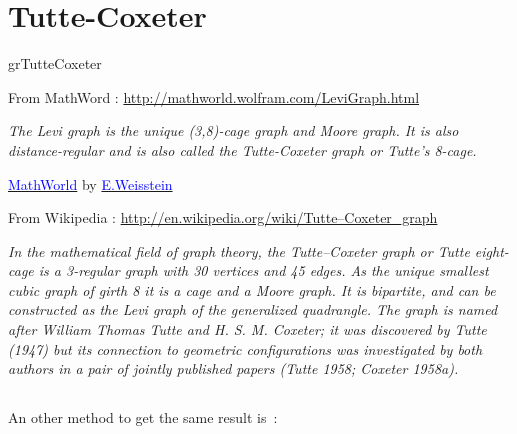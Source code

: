 \newpage\section{Tutte-Coxeter}\label{tutte}


\begin{NewMacroBox}{grTutteCoxeter}{}

\medskip
From MathWord : \url{http://mathworld.wolfram.com/LeviGraph.html}

\emph{The Levi graph is the unique (3,8)-cage graph and Moore graph. It is also distance-regular and is also called the Tutte-Coxeter graph or Tutte's 8-cage.}

\href{http://mathworld.wolfram.com/topics/GraphTheory.html}%
           {\textcolor{blue}{MathWorld}} by \href{http://en.wikipedia.org/wiki/Eric_W._Weisstein}%
           {\textcolor{blue}{E.Weisstein}}   
           
\medskip
From Wikipedia : \url{http://en.wikipedia.org/wiki/Tutte–Coxeter_graph}

\emph{In the mathematical field of graph theory, the Tutte–Coxeter graph or Tutte eight-cage is a 3-regular graph with 30 vertices and 45 edges. As the unique smallest cubic graph of girth 8 it is a cage and a Moore graph. It is bipartite, and can be constructed as the Levi graph of the generalized quadrangle. The graph is named after William Thomas Tutte and H. S. M. Coxeter; it was discovered by Tutte (1947) but its connection to geometric configurations was investigated by both authors in a pair of jointly published papers (Tutte 1958; Coxeter 1958a).}
\end{NewMacroBox}

\subsection{}
An other method to get the same result is~:

\medskip
\begin{tkzexample}
 \end{tkzexample}

\bigskip
\begin{center}
\begin{tkzexample}[vbox]
\end{tkzexample}

\end{center}

\endinput